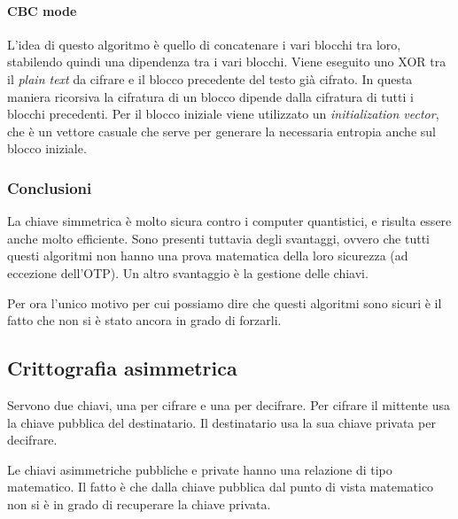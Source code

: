 \paragraph{CBC mode}

L'idea di questo algoritmo è quello di concatenare i vari blocchi tra loro, 
stabilendo quindi una dipendenza tra i vari blocchi. Viene eseguito uno XOR tra 
il \textit{plain text} da cifrare e il blocco precedente del testo già cifrato. 
In questa maniera ricorsiva la cifratura di un blocco dipende dalla cifratura di 
tutti i blocchi precedenti. Per il blocco iniziale viene utilizzato un 
\textit{initialization vector}, che è un vettore casuale che serve per generare 
la necessaria entropia anche sul blocco iniziale.


\subsubsection{Conclusioni}

La chiave simmetrica è molto sicura contro i computer quantistici, e risulta 
essere anche molto efficiente. Sono presenti tuttavia degli svantaggi, ovvero 
che tutti questi algoritmi non hanno una prova matematica della loro 
sicurezza (ad eccezione dell'OTP). Un altro svantaggio è la gestione delle 
chiavi.

Per ora l'unico motivo per cui possiamo dire che questi algoritmi sono sicuri è 
il fatto che non si è stato ancora in grado di forzarli.

\subsection{Crittografia asimmetrica}

Servono due chiavi, una per cifrare e una per decifrare. Per cifrare il 
mittente usa la chiave pubblica del destinatario. Il destinatario usa la sua 
chiave privata per decifrare.


Le chiavi asimmetriche pubbliche e private hanno una relazione di tipo 
matematico. Il fatto è che dalla chiave pubblica dal punto di vista matematico 
non si è in grado di recuperare la chiave privata.

